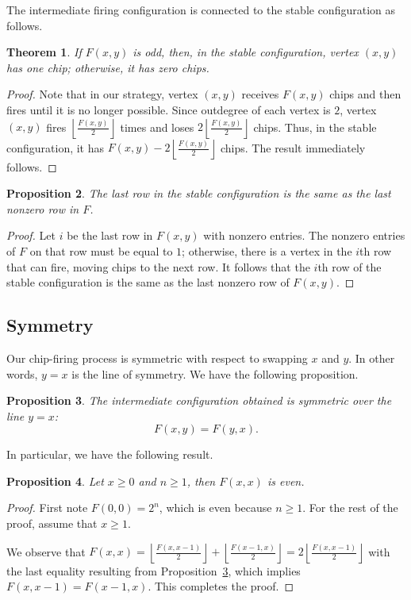 \documentclass[11pt]{article}
\newtheorem{theorem}{Theorem}[section] %
\newtheorem{proposition}[theorem]{Proposition}
\theoremstyle{definition}
\theoremstyle{remark}
\newcommand{\floor}[1]{\left\lfloor #1 \right\rfloor}
\begin{document}
The intermediate firing configuration is connected to the stable configuration as follows.

\begin{theorem}
\label{thm:stableisodd}
If $F(x,y)$ is odd, then, in the stable configuration, vertex $(x, y)$ has one chip; otherwise, it has zero chips.
\end{theorem}

\begin{proof}
    Note that in our strategy, vertex $(x, y)$ receives $F(x, y)$ chips and then fires until it is no longer possible. Since outdegree of each vertex is $2$, vertex $(x, y)$ fires $\floor{\frac{F(x, y)}{2}}$ times and loses $2\floor{\frac{F(x, y)}{2}}$ chips. Thus, in the stable configuration, it has $F(x, y) - 2\floor{\frac{F(x, y)}{2}}$ chips. The result immediately follows.
\end{proof}

\begin{proposition}
    The last row in the stable configuration is the same as the last nonzero row in $F$.
\end{proposition}

\begin{proof}
Let $i$ be the last row in $F(x, y)$ with nonzero entries. The nonzero entries of $F$ on that row must be equal to $1$; otherwise, there is a vertex in the $i$th row that can fire, moving chips to the next row. It follows that the $i$th row of the stable configuration is the same as the last nonzero row of $F(x, y)$.
\end{proof}



\subsection{Symmetry}

Our chip-firing process is symmetric with respect to swapping $x$ and $y$. In other words, $y=x$ is the line of symmetry. We have the following proposition.

\begin{proposition}\label{prop:symmetry}
The intermediate configuration obtained is symmetric over the line $y=x$:
\[F(x,y) = F(y,x).\]
\end{proposition}

In particular, we have the following result.

\begin{proposition}
\label{prop:evenCentre}
    Let $x \geq 0$ and $n \geq 1$, then $F(x, x)$ is even.
\end{proposition}
\begin{proof}
    First note $F(0, 0) = 2^n$, which is even because $n \geq 1$. For the rest of the proof, assume that $x \geq 1$.

    We observe that $F(x, x)  = \floor{\frac{F(x, x-1)}{2}} + \floor{\frac{F(x-1, x)}{2}} = 2\floor{\frac{F(x, x-1)}{2}}$ with the last equality resulting from Proposition~\ref{prop:symmetry}, which implies $F(x, x-1) = F(x-1, x)$. This completes the proof.
\end{proof}
\end{document}

